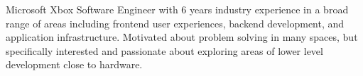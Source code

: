 

\begin{cvparagraph}

Microsoft Xbox Software Engineer with 6 years industry experience in a broad range of areas including frontend user experiences, backend development, and application infrastructure. Motivated about problem solving in many spaces, but specifically interested and passionate about exploring areas of lower level development close to hardware.
\end{cvparagraph}
